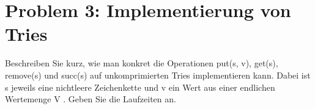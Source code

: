 \section*{Problem 3: Implementierung von Tries} 


\noindent
Beschreiben Sie kurz, wie man konkret die Operationen put(s, v), get(s), remove(s)
und succ(s) auf unkomprimierten Tries implementieren kann. Dabei ist s jeweils
eine nichtleere Zeichenkette und v ein Wert aus einer endlichen Wertemenge V .
Geben Sie die Laufzeiten an.\\
